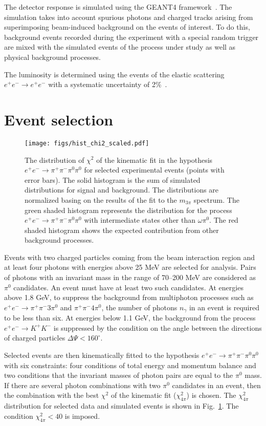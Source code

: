 \documentclass[twocolumn,aps,prd,floatfix,nofootinbib,superscriptaddress]{revtex4-2}
\begin{document}
The detector response is simulated using the GEANT4 framework~\cite{geant4}.
The simulation takes into account spurious photons and charged tracks arising from superimposing beam-induced background on the events of interest.
To do this, background events recorded during the experiment with a special random trigger are mixed with the simulated events of the process under study as well as physical background processes.

The luminosity is determined using the events of the elastic scattering \(e^+e^- \to e^+e^- \) with a systematic uncertainty of 2\%~\cite{snd_etapp_2015}.

\section{Event selection}

\begin{figure}
\centering
\texttt{[image: figs/hist\_chi2\_scaled.pdf]}
\caption{
	The distribution of $\chi^2$ of the kinematic fit in the hypothesis \( e^+e^- \to \pi^+\pi^-\pi^0\pi^0 \) for selected experimental events (points with error bars).
	The solid histogram is the sum of simulated distributions for signal and background.
	The distributions are normalized basing on the results of the fit to the $m_{3\pi}$ spectrum.
	The green shaded histogram represents the distribution for the process \( e^+e^- \to \pi^+\pi^-\pi^0\pi^0 \) with intermediate states other than $\omega\pi^0$.
	The red shaded histogram shows the expected contribution from other background processes.
}
\label{fig:chi2mix4pi}
\end{figure}

Events with two charged particles coming from the beam interaction region and at least four photons with energies above 25 MeV are selected for analysis.
Pairs of photons with an invariant mass in the range of 70--200 MeV are considered as $\pi^0$ candidates.
An event must have at least two such candidates.
At energies above 1.8 GeV, to suppress the background from multiphoton processes such as \( e^+e^- \to \pi^+\pi^-3\pi^0 \) and \( \pi^+\pi^-4\pi^0 \), the number of photons $n_\gamma$ in an event is required to be less than six.
At energies below 1.1 GeV, the background from the process \( e^+e^- \to K^+K^- \) is suppressed by the condition on the angle between the directions of charged particles \( \Delta\Psi < 160^\circ \).

Selected events are then kinematically fitted to the hypothesis \( e^+e^- \to \pi^+\pi^-\pi^0\pi^0 \) with six constraints: four conditions of total energy and momentum balance and two conditions that the invariant masses of photon pairs are equal to the $\pi^0$ mass.
If there are several photon combinations with two $\pi^0$ candidates in an event, then the combination with the best $\chi^2$ of the kinematic fit ($\chi^2_{4\pi}$) is chosen.
The $\chi^2_{4\pi}$ distribution for selected data and simulated events is shown in Fig.~\ref{fig:chi2mix4pi}.
The condition $\chi^2_{4\pi} < 40$ is imposed.
\end{document}
